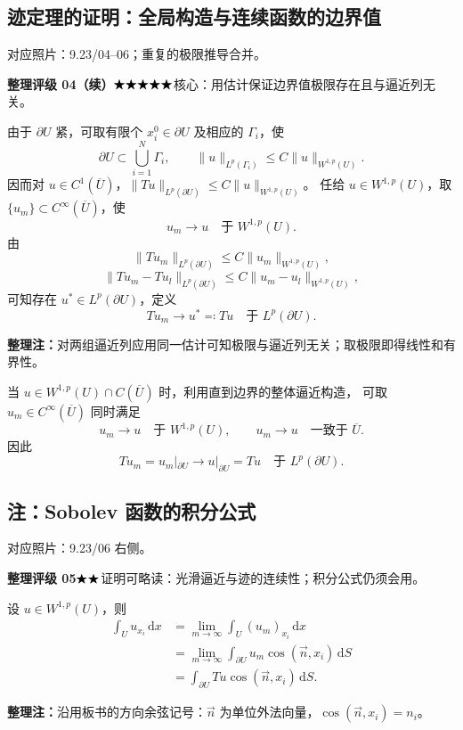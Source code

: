 \documentclass[UTF8,a4paper,11pt,fontset=fandol]{ctexart}
\newcommand{\dd}{\,\mathrm d}
\newcommand{\ednote}[1]{\par{\small\color{notegray}\textbf{整理注：}#1}\par}
\newcommand{\source}[1]{{\small\color{notegray}对应照片：#1。}\par}
\newcommand{\proofstars}[1]{\ensuremath{%
\ifnum#1>0\relax\bigstar\fi
\ifnum#1>1\relax\bigstar\fi
\ifnum#1>2\relax\bigstar\fi
\ifnum#1>3\relax\bigstar\fi
\ifnum#1>4\relax\bigstar\fi}}
\newcommand{\proofrating}[3]{\par{\small\color{proofblue}%
\textbf{整理评级 #1}\enspace\proofstars{#2}\quad #3\par}}
\begin{document}
\subsection*{迹定理的证明：全局构造与连续函数的边界值}
\source{9.23/04--06；重复的极限推导合并}
\proofrating{04（续）}{5}{核心：用估计保证边界值极限存在且与逼近列无关。}
由于 $\partial U$ 紧，可取有限个 $x_i^0\in\partial U$ 及相应的 $\Gamma_i$，使
\[
\partial U\subset\bigcup_{i=1}^N\Gamma_i,\qquad
\|u\|_{L^p(\Gamma_i)}\leq C\|u\|_{W^{1,p}(U)}.
\]
因而对 $u\in C^1(\overline U)$，$\|Tu\|_{L^p(\partial U)}\leq C\|u\|_{W^{1,p}(U)}$。
任给 $u\in W^{1,p}(U)$，取 $\{u_m\}\subset C^\infty(\overline U)$，使
\[
u_m\longrightarrow u\quad\text{于 }W^{1,p}(U).
\]
由
\[
\|Tu_m\|_{L^p(\partial U)}\leq C\|u_m\|_{W^{1,p}(U)},
\]
\[
\|Tu_m-Tu_l\|_{L^p(\partial U)}\leq C\|u_m-u_l\|_{W^{1,p}(U)},
\]
可知存在 $u^*\in L^p(\partial U)$，定义
\[
Tu_m\longrightarrow u^*\eqqcolon Tu\quad\text{于 }L^p(\partial U).
\]
\ednote{对两组逼近列应用同一估计可知极限与逼近列无关；取极限即得线性和有界性。}
当 $u\in W^{1,p}(U)\cap C(\overline U)$ 时，利用直到边界的整体逼近构造，
可取 $u_m\in C^\infty(\overline U)$ 同时满足
\[
u_m\to u\quad\text{于 }W^{1,p}(U),\qquad
u_m\to u\quad\text{一致于 }\overline U.
\]
因此
\[
Tu_m=u_m|_{\partial U}\longrightarrow u|_{\partial U}=Tu
\quad\text{于 }L^p(\partial U).
\]
\subsection*{注：Sobolev 函数的积分公式}
\source{9.23/06 右侧}
\proofrating{05}{2}{证明可略读：光滑逼近与迹的连续性；积分公式仍须会用。}
设 $u\in W^{1,p}(U)$，则
\[
\begin{aligned}
\int_Uu_{x_i}\dd x
&=\lim_{m\to\infty}\int_U(u_m)_{x_i}\dd x\\
&=\lim_{m\to\infty}\int_{\partial U}u_m\cos(\vec n,x_i)\dd S\\
&=\int_{\partial U}Tu\cos(\vec n,x_i)\dd S.
\end{aligned}
\]
\ednote{沿用板书的方向余弦记号：$\vec n$ 为单位外法向量，$\cos(\vec n,x_i)=n_i$。}

\newpage
\end{document}

